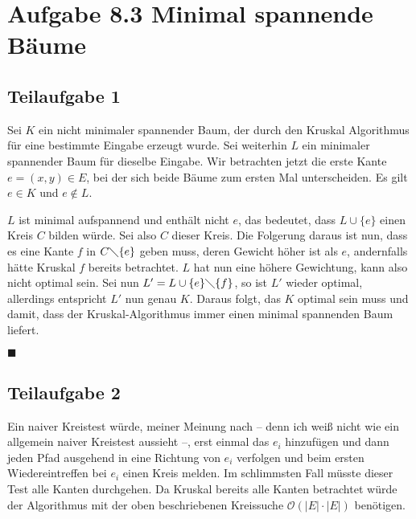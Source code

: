 \documentclass[a4paper, fontsize=10pt]{scrartcl}
\begin{document}
\section*{Aufgabe 8.3 Minimal spannende Bäume}

\subsection*{Teilaufgabe 1}
Sei $K$ ein nicht minimaler spannender Baum, der durch den Kruskal Algorithmus für eine bestimmte Eingabe erzeugt wurde. Sei weiterhin $L$ ein minimaler spannender Baum für dieselbe Eingabe. Wir betrachten jetzt die erste Kante $e=(x,y) \in E$, bei der sich beide Bäume zum ersten Mal unterscheiden. Es gilt $e \in K$ und $e \not\in L$.\smallskip

$L$ ist minimal aufspannend und enthält nicht $e$, das bedeutet, dass $L\cup \{e\}$ einen Kreis $C$ bilden würde. Sei also $C$ dieser Kreis. Die Folgerung daraus ist nun, dass es eine Kante $f$ in $C \diagdown \{e\}$ geben muss, deren Gewicht höher ist als $e$, andernfalls hätte Kruskal $f$ bereits betrachtet. $L$ hat nun eine höhere Gewichtung, kann also nicht optimal sein. Sei nun $L'=L\cup \{e\} \diagdown \{f\}$, so ist $L'$ wieder optimal, allerdings entspricht $L'$ nun genau $K$. Daraus folgt, das $K$ optimal sein muss und damit, dass der Kruskal-Algorithmus immer einen minimal spannenden Baum liefert.
\begin{flushright}$\blacksquare$\end{flushright} 


\subsection*{Teilaufgabe 2}
Ein naiver Kreistest würde, meiner Meinung nach -- denn ich weiß nicht wie ein allgemein naiver Kreistest aussieht --, erst einmal das $e_i$ hinzufügen und dann jeden Pfad ausgehend in eine Richtung von $e_i$ verfolgen und beim ersten Wiedereintreffen bei $e_i$ einen Kreis melden. Im schlimmsten Fall müsste dieser Test alle Kanten durchgehen. Da Kruskal bereits alle Kanten betrachtet würde der Algorithmus mit der oben beschriebenen Kreissuche $\mathcal{O}(|E|\cdot|E|)$ benötigen.
\end{document}
